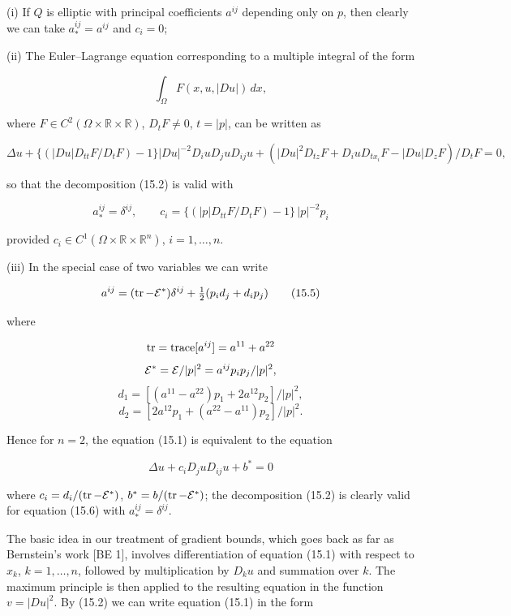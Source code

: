 
(i) If $Q$ is elliptic with principal coefficients $a^{ij}$ depending only on $p$, then clearly we can take $a_*^{ij}=a^{ij}$ and $c_i=0$;

(ii) The Euler--Lagrange equation corresponding to a multiple integral of the form

\begin{equation}
\int_{\Omega} F(x,u,|Du|)\,dx,
\tag{15.3}
\end{equation}

where $F\in C^2(\Omega\times\mathbb{R}\times\mathbb{R})$, $D_tF\neq 0$, $t=|p|$, can be written as

\begin{equation}
\Delta u+\{(|Du|D_{tt}F/D_tF)-1\}|Du|^{-2}D_i u D_j u D_{ij}u
+ (|Du|^2D_{tz}F + D_i u D_{tx_i}F - |Du|D_zF)/D_tF=0,
\tag{15.4}
\end{equation}

so that the decomposition (15.2) is valid with

\[
a_*^{ij}=\delta^{ij},\qquad c_i=\{(|p|D_{tt}F/D_tF)-1\}\,|p|^{-2}p_i
\]

provided $c_i\in C^1(\Omega\times\mathbb{R}\times\mathbb{R}^n)$, $i=1,\ldots,n$.

(iii) In the special case of two variables we can write

\begin{equation}
 a^{ij}=(\operatorname{tr}-\mathcal{E}^{*})\delta^{ij}+\tfrac12(p_i d_j+d_i p_j)
\tag{15.5}
\end{equation}

where

\[
\operatorname{tr}=\operatorname{trace}[a^{ij}]=a^{11}+a^{22}
\]
\[
\mathcal{E}^{*}=\mathcal{E}/|p|^2=a^{ij}p_ip_j/|p|^2,
\]
\[
d_1=[(a^{11}-a^{22})p_1+2a^{12}p_2]/|p|^2,
\]
\[
d_2=[2a^{12}p_1+(a^{22}-a^{11})p_2]/|p|^2.
\]

Hence for $n=2$, the equation (15.1) is equivalent to the equation

\begin{equation}
\Delta u+c_iD_j uD_{ij}u+b^*=0
\tag{15.6}
\end{equation}

where $c_i=d_i/(\operatorname{tr}-\mathcal{E}^{*})$, $b^*=b/(\operatorname{tr}-\mathcal{E}^{*})$; the decomposition (15.2) is clearly valid for equation (15.6) with $a_*^{ij}=\delta^{ij}$.

The basic idea in our treatment of gradient bounds, which goes back as far as Bernstein's work [BE 1], involves differentiation of equation (15.1) with respect to $x_k$, $k=1,\ldots,n$, followed by multiplication by $D_k u$ and summation over $k$. The maximum principle is then applied to the resulting equation in the function $v=|Du|^2$. By (15.2) we can write equation (15.1) in the form

